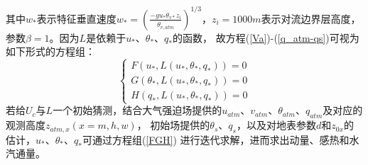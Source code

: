 其中$w_\ast$表示特征垂直速度$w_\ast={(\frac{-gu_\ast\theta_{v\ast}z_i}{\bar{\theta_{v,atm}}})}^{1/3}$，$z_i=1000m$表示对流边界层高度，
参数$\beta=1$。因为$L$是依赖于$u_\ast$、$\theta_\ast$、$q_\ast$的函数，
故方程(\ref{Va})-(\ref{q_atm-qs})可视为如下形式的方程组：
\begin{equation}\label{FGH}
\left\{\begin{array}{l}F\left(u_{*}, L\left(u_{*}, \theta_{*}, q_{*}\right)\right)=0 \\
      G\left(\theta_{*}, L\left(u_{*}, \theta_{*}, q_{*}\right)\right)=0 \\ 
      H\left(q_{*}, L\left(u_{*}, \theta_{*}, q_{*}\right)\right)=0\end{array}\right.
\end{equation}
若给$U_c$与$L$一个初始猜测，结合大气强迫场提供的$u_{atm}$、$v_{atm}$、$\theta_{atm}$、$q_{atm}$及对应的观测高度$z_{atm,x}(x=m,h,w)$，
初始场提供的$\theta_s$、$q_s$，以及对地表参数$d$和$z_{0x}$的估计，$u_\ast$、$\theta_\ast$、$q_\ast$可通过方程组(\ref{FGH})
进行迭代求解，进而求出动量、感热和水汽通量。


